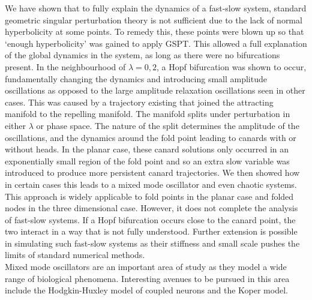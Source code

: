We have shown that to fully explain the dynamics of a fast-slow system, standard
geometric singular perturbation theory is not sufficient due to the lack of
normal hyperbolicity at some points. To remedy this, these points were blown up
so that `enough hyperbolicity' was gained to apply GSPT. This allowed a full
explanation of the global dynamics in the system, as long as there were no
bifurcations present. In the neighbourhood of $\lambda=0,2$, a Hopf bifurcation
was shown to occur, fundamentally changing the dynamics and introducing small
amplitude oscillations as opposed to the large amplitude relaxation oscillations
seen in other cases. This was caused by a trajectory existing that joined the
attracting manifold to the repelling manifold. The manifold splits under perturbation in either $\lambda$ or phase space. The nature of the split determines the amplitude of the oscillations, and the dynamics around the fold point leading to canards with or without heads. In the planar case, these canard solutions only occurred in an
exponentially small region of the fold point and so an extra slow variable was
introduced to produce more persistent canard trajectories. We then showed how in
certain cases this leads to a mixed mode oscillator and even chaotic systems. \\

This approach is widely applicable to fold points in the planar case and folded
nodes in the three dimensional case. However, it does not complete the analysis
of fast-slow systems. If a Hopf bifurcation occurs close to the canard point,
the two interact in a way that is not fully understood. Further extension is
possible in simulating such fast-slow systems as their stiffness and small scale
pushes the limits of standard numerical methods. \\  

Mixed mode oscillators are an important area of study as they model a wide range
of biological phenomena. Interesting avenues to be pursued in this area include
the Hodgkin-Huxley model of coupled neurons and the Koper model.
